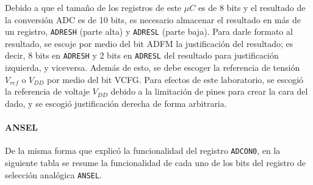 Debido a que el tamaño de los registros de este $\mu C$ es de 8 bits y el resultado de la conversión ADC es de 10 bits, es necesario almacenar el resultado en más de un registro, \texttt{ADRESH} (parte alta) y \texttt{ADRESL} (parte baja). 
Para darle formato al resultado, se escoje por medio del bit ADFM la justificación del resultado; es decir, 8 bits en \texttt{ADRESH} y 2 bits en \texttt{ADRESL} del resultado para justificación izquierda, y viceversa. 
Además de esto, se debe escoger la referencia de tensión $V _{ref}$ o $V _{DD}$ por medio del bit VCFG. 
Para efectos de este laboratorio, se escogió la referencia de voltaje $V _{DD}$ debido a la limitación de pines para crear la cara del dado, y se escogió justificación derecha de forma arbitraria.

\newpage

\paragraph{ANSEL}

De la misma forma que explicó la funcionalidad del registro \texttt{ADCON0}, en la siguiente tabla se resume la funcionalidad de cada uno de los bits del registro de selección analógica \texttt{ANSEL}. 

